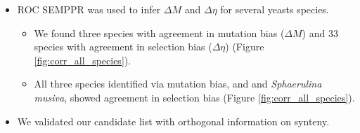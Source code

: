 \documentclass[12pt]{article}
\begin{document}
\begin{itemize}
\begin{itemize}
	\end{itemize}
	\item ROC SEMPPR was used to infer $\Delta M$ and $\Delta \eta$ for several yeasts species.
	\begin{itemize}
		\item We found three species with agreement in mutation bias ($\Delta M$) and $33$ species with agreement in selection bias ($\Delta \eta$) (Figure \ref{fig:corr_all_species}).
		\item All three species identified via mutation bias, \gossypii and \dubl and \textit{Sphaerulina musiva}, showed agreement in selection bias (Figure \ref{fig:corr_all_species}).
	\end{itemize}
	\item We validated our candidate list with orthogonal information on synteny.
	\begin{itemize}

\end{itemize}
\end{itemize}
\end{document}
